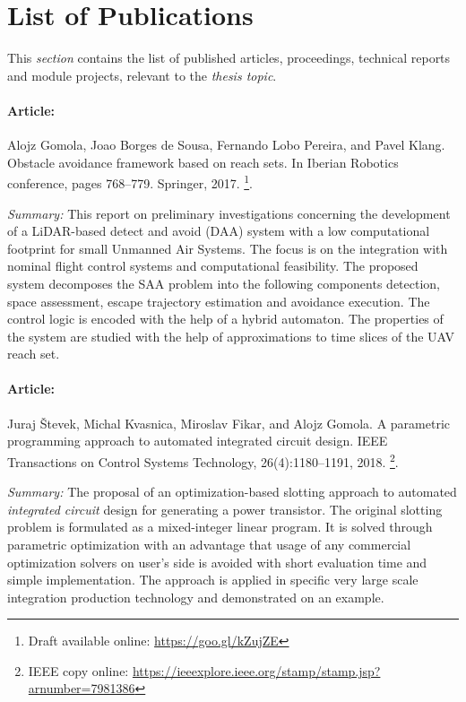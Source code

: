 \section{List of Publications}\label{sec:listOfPublications}

\noindent This \emph{section} contains the list of published articles, proceedings, technical reports and module projects, relevant to the \emph{thesis topic}.

\paragraph{Article:} Alojz Gomola, Joao Borges de Sousa, Fernando Lobo Pereira, and Pavel Klang. Obstacle avoidance framework based on reach sets. In Iberian Robotics conference, pages 768–779. Springer, 2017. \cite{gomola2017obstacle}\footnote{Draft available online: \url{https://goo.gl/kZujZE}}.

\emph{Summary:} This report on preliminary investigations concerning the development of a LiDAR-based detect and avoid (DAA) system with a low computational footprint for small Unmanned Air Systems. The focus is on the integration with nominal flight control systems and computational feasibility. The proposed system decomposes the SAA problem into the following components detection, space assessment, escape trajectory estimation and avoidance execution. The control logic is encoded with the help of a hybrid automaton. The properties of the system are studied with the help of approximations to time slices of the UAV reach set.


\paragraph{Article:}  Juraj {\v{S}}tevek,  Michal  Kvasnica,  Miroslav  Fikar,  and  Alojz  Gomola. A  parametric programming  approach  to  automated  integrated  circuit  design. IEEE Transactions on Control Systems Technology, 26(4):1180–1191, 2018. \cite{vstevek2018parametric}\footnote{IEEE copy online: \url{https://ieeexplore.ieee.org/stamp/stamp.jsp?arnumber=7981386}}.

\emph{Summary:} The proposal of an optimization-based slotting approach to automated \emph{integrated circuit} design for generating a power transistor. The original slotting problem is formulated as a mixed-integer linear program. It is solved through parametric optimization with an advantage that usage of any commercial optimization solvers on user’s side is avoided with short evaluation time and simple implementation. The approach is applied in specific very large scale integration production technology and demonstrated on an example.

